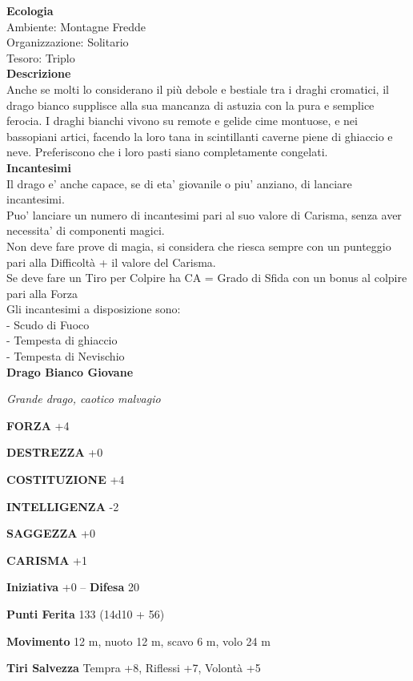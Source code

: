 \begin{multicols}{2}
\textbf{Ecologia}\\
Ambiente: Montagne Fredde\\
Organizzazione: Solitario\\
Tesoro: Triplo\\
\textbf{Descrizione}\\
Anche se molti lo considerano il più debole e bestiale tra i draghi cromatici, il drago bianco supplisce alla sua mancanza di astuzia con la pura e semplice ferocia. I draghi bianchi vivono su remote e gelide cime montuose, e nei bassopiani artici, facendo la loro tana in scintillanti caverne piene di ghiaccio e neve. Preferiscono che i loro pasti siano completamente congelati.\\
\textbf{Incantesimi}\\
Il drago e' anche capace, se di eta' giovanile o piu' anziano, di lanciare incantesimi.\\
Puo' lanciare un numero di incantesimi pari al suo valore di Carisma, senza aver necessita' di componenti magici.\\
Non deve fare prove di magia, si considera che riesca sempre con un punteggio pari alla Difficoltà + il valore del Carisma.\\
Se deve fare un Tiro per Colpire ha CA = Grado di Sfida con un bonus al colpire pari alla Forza\\
Gli incantesimi a disposizione sono:\\
- Scudo di Fuoco\\
- Tempesta di ghiaccio\\
- Tempesta di Nevischio\\


\medskip{}\textbf{Drago Bianco Giovane}

\emph{Grande drago, caotico malvagio}

\textbf{FORZA} +4

\textbf{DESTREZZA} +0

\textbf{COSTITUZIONE} +4

\textbf{INTELLIGENZA} -2

\textbf{SAGGEZZA} +0

\textbf{CARISMA} +1

\textbf{Iniziativa} +0 -- \textbf{Difesa} 20

\textbf{Punti Ferita} 133 (14d10 + 56)

\textbf{Movimento} 12 m, nuoto 12 m, scavo 6 m, volo 24 m

\textbf{Tiri Salvezza} Tempra +8, Riflessi +7, Volontà +5


\end{multicols}
